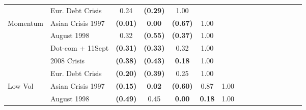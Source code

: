 \documentclass[12pt]{article}
\begin{document}
\begin{table}[H]
{\begin{tabular}{@{}llcccccccccccccc@{}}
                  & Eur. Debt Crisis  & 0.24            & \textbf{(0.29)} & 1.00            &                 &                 &                 &                 &                 &                 &                 &                 &                 &                 &                 \\
Momentum          & Asian Crisis 1997 & \textbf{(0.01)} & \textbf{0.00}   & \textbf{(0.67)} & 1.00            & \textbf{}       & \textbf{}       & \textbf{}       & \textbf{}       &                 &                 &                 &                 &                 &                 \\
                  & August 1998       & 0.32            & \textbf{(0.55)} & \textbf{(0.37)} & 1.00            &                 &                 &                 &                 &                 &                 &                 &                 &                 &                 \\
                  & Dot-com + 11Sept  & \textbf{(0.31)} & \textbf{(0.33)} & 0.32            & 1.00            &                 &                 &                 &                 &                 &                 &                 &                 &                 &                 \\
                  & 2008 Crisis       & \textbf{(0.38)} & \textbf{(0.43)} & \textbf{0.18}   & 1.00            &                 &                 &                 &                 &                 &                 &                 &                 &                 &                 \\
                  & Eur. Debt Crisis  & \textbf{(0.20)} & \textbf{(0.39)} & 0.25            & 1.00            &                 &                 &                 &                 &                 &                 &                 &                 &                 &                 \\
Low Vol           & Asian Crisis 1997 & \textbf{(0.15)} & \textbf{0.02}   & \textbf{(0.60)} & 0.87            & 1.00            & \textbf{}       & \textbf{}       & \textbf{}       &                 &                 &                 &                 &                 &                 \\
                  & August 1998       & \textbf{(0.49)} & 0.45            & \textbf{0.00}   & \textbf{0.18}   & 1.00            &                 &                 &                 &                 &                 &                 &                 &                 &                 \\

\end{tabular}}
\end{table}
\end{document}
